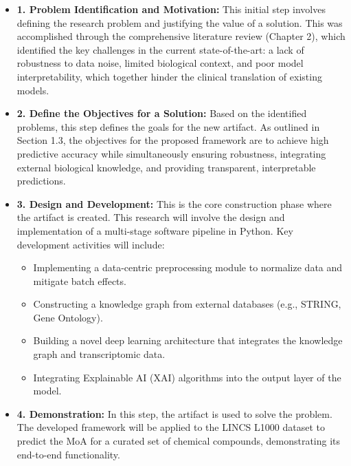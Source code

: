 \documentclass[12pt,a4paper]{article}
\begin{document}
\begin{itemize}
    \item \textbf{1. Problem Identification and Motivation:} This initial step involves defining the research problem and justifying the value of a solution. This was accomplished through the comprehensive literature review (Chapter 2), which identified the key challenges in the current state-of-the-art: a lack of robustness to data noise, limited biological context, and poor model interpretability, which together hinder the clinical translation of existing models.

    \item \textbf{2. Define the Objectives for a Solution:} Based on the identified problems, this step defines the goals for the new artifact. As outlined in Section 1.3, the objectives for the proposed framework are to achieve high predictive accuracy while simultaneously ensuring robustness, integrating external biological knowledge, and providing transparent, interpretable predictions.

    \item \textbf{3. Design and Development:} This is the core construction phase where the artifact is created. This research will involve the design and implementation of a multi-stage software pipeline in Python. Key development activities will include:
        \begin{itemize}
            \item Implementing a data-centric preprocessing module to normalize data and mitigate batch effects.
            \item Constructing a knowledge graph from external databases (e.g., STRING, Gene Ontology).
            \item Building a novel deep learning architecture that integrates the knowledge graph and transcriptomic data.
            \item Integrating Explainable AI (XAI) algorithms into the output layer of the model.
        \end{itemize}

    \item \textbf{4. Demonstration:} In this step, the artifact is used to solve the problem. The developed framework will be applied to the LINCS L1000 dataset to predict the MoA for a curated set of chemical compounds, demonstrating its end-to-end functionality.


\end{itemize}
\end{document}

